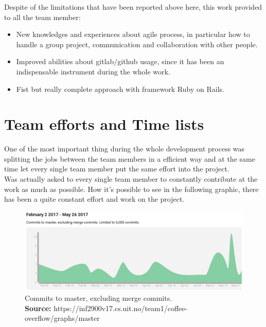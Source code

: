 Despite of the limitations that have been reported above here, this work provided to all the team member:
\vspace{-5mm}
\begin{itemize}
 \setlength{\itemsep}{-5pt}
\item New knowledges and experiences about agile process, in particular how to handle a group project, communication and collaboration with other people.
\item Improved abilities about gitlab/github usage, since it has been an indispensable instrument during the whole work.
\item Fist but really complete approach with framework Ruby on Rails.
\end{itemize}



\section{Team efforts and Time lists}
\vspace{-5mm}
One of the most important thing during the whole development process was splitting the jobs between the team members in a efficient way and at the same time let every single team member put the same effort into the project.\\
Was actually asked to every single team member to constantly contribute at the work as much as possible. How it's possible to see in the following graphic, there has been a quite constant effort and work on the project.
\begin{figure}[H]
	\centering
    \includegraphics[trim={0 0 0 0},clip,width=1\textwidth]{Files/commitsToMaster.png}
    \caption{Commits to master, excluding merge commits.\\ \textbf{Source:} https://inf2900v17.cs.uit.no/team1/coffee-overflow/graphs/master}
    \label{fig: MVC}
\end{figure}


